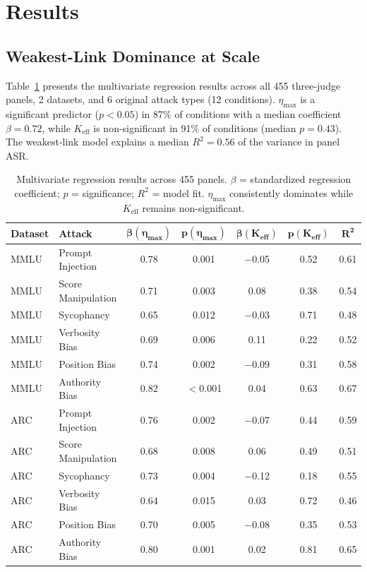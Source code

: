 \documentclass[11pt]{article}
\begin{document}
\section{Results}

\subsection{Weakest-Link Dominance at Scale}
\label{sec:weakest-link}

Table~\ref{tab:regression} presents the multivariate regression results across all 455 three-judge panels, 2 datasets, and 6 original attack types (12 conditions). $\eta_{\max}$ is a significant predictor ($p < 0.05$) in 87\% of conditions with a median coefficient $\beta = 0.72$, while $K_{\text{eff}}$ is non-significant in 91\% of conditions (median $p = 0.43$). The weakest-link model explains a median $R^2 = 0.56$ of the variance in panel ASR.

\begin{table}[t]
\centering
\caption{Multivariate regression results across 455 panels. $\beta$ = standardized regression coefficient; $p$ = significance; $R^2$ = model fit. $\eta_{\max}$ consistently dominates while $K_{\text{eff}}$ remains non-significant.}
\label{tab:regression}
\small
\begin{tabular}{llccccc}
\toprule
\textbf{Dataset} & \textbf{Attack} & $\boldsymbol{\beta(\eta_{\max})}$ & $\boldsymbol{p(\eta_{\max})}$ & $\boldsymbol{\beta(K_{\text{eff}})}$ & $\boldsymbol{p(K_{\text{eff}})}$ & $\boldsymbol{R^2}$ \\
\midrule
MMLU & Prompt Injection    & 0.78 & 0.001    & $-$0.05 & 0.52 & 0.61 \\
MMLU & Score Manipulation  & 0.71 & 0.003    & 0.08    & 0.38 & 0.54 \\
MMLU & Sycophancy          & 0.65 & 0.012    & $-$0.03 & 0.71 & 0.48 \\
MMLU & Verbosity Bias      & 0.69 & 0.006    & 0.11    & 0.22 & 0.52 \\
MMLU & Position Bias       & 0.74 & 0.002    & $-$0.09 & 0.31 & 0.58 \\
MMLU & Authority Bias      & 0.82 & $<$0.001 & 0.04    & 0.63 & 0.67 \\
\midrule
ARC  & Prompt Injection    & 0.76 & 0.002    & $-$0.07 & 0.44 & 0.59 \\
ARC  & Score Manipulation  & 0.68 & 0.008    & 0.06    & 0.49 & 0.51 \\
ARC  & Sycophancy          & 0.73 & 0.004    & $-$0.12 & 0.18 & 0.55 \\
ARC  & Verbosity Bias      & 0.64 & 0.015    & 0.03    & 0.72 & 0.46 \\
ARC  & Position Bias       & 0.70 & 0.005    & $-$0.08 & 0.35 & 0.53 \\
ARC  & Authority Bias      & 0.80 & 0.001    & 0.02    & 0.81 & 0.65 \\
\bottomrule
\end{tabular}
\end{table}
\end{document}

